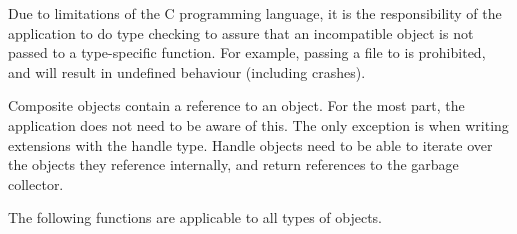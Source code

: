 Due to limitations of the C programming language, it is the responsibility of
the application to do type checking to assure that an incompatible
 object is not passed to a type-specific function.  For example,
passing a file  to  is prohibited, and
will result in undefined behaviour (including crashes).

Composite objects contain a reference to an  object.  For the
most part, the application does not need to be aware of this.  The only
exception is when writing extensions with the handle type.  Handle objects need
to be able to iterate over the objects they reference internally, and return
 references to the garbage collector.

The following functions are applicable to all types of  objects.

